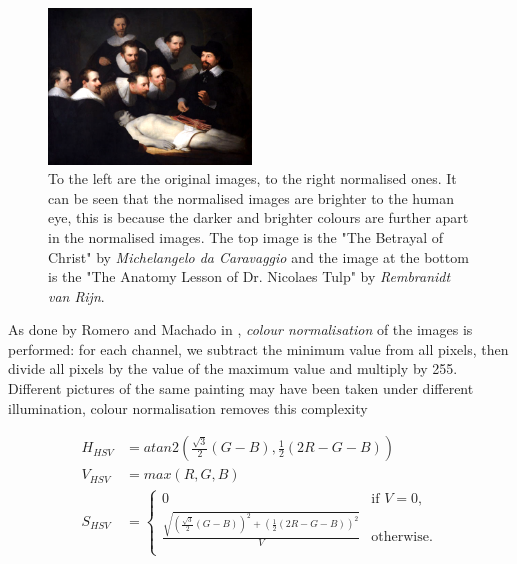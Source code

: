 \documentclass[11pt,a4paper,twoside,openright,draft]{report}
\begin{document}
\begin{multicols}{2}
\begin{figure}[tbp]
\includegraphics[width=0.48\textwidth]{rembrandt_eu_464}
\caption[Colour normalisation]{To the left are the original images, to the
right normalised ones.  It can be seen that the normalised images are brighter
to the human eye, this is because the darker and brighter colours are further
apart in the normalised images.  The top image is the "The Betrayal of Christ"
by \emph{Michelangelo da Caravaggio} and the image at the bottom is the "The
Anatomy Lesson of Dr. Nicolaes Tulp" by \emph{Rembranidt van Rijn}.}
\label{fig:norm}
\end{figure}

As done by Romero and Machado in  \cite{jma12clas}, \emph{colour normalisation}
of the images is performed: for each channel, we subtract the minimum value
from all pixels, then divide all pixels by the value of the maximum value and
multiply by 255.  Different pictures of the same painting may have been taken
under different illumination, colour normalisation removes this complexity

\begin{figure}[!htb]
\begin{equation}
\begin{aligned}
H_{HSV}  &= atan2\left(\frac{\sqrt{3}}{2}(G-B), \frac{1}{2}(2R-G-B)\right) \\
V_{HSV}  &= max(R,G,B) \\
S_{HSV}  &= \left\{
  \begin{array}{ll}
    0  &  \text{if } V = 0, \\
    \frac{\sqrt{ \left(\frac{\sqrt{3}}{2}(G-B)\right)^2
               + \left(\frac{1}{2}(2R-G-B)\right)^2 }}{V}
  &  \text{otherwise}. \\
  \end{array}
            \right.
\label{eq:hsv}
\end{aligned}
\end{equation}
\end{figure}


\end{multicols}
\end{document}
